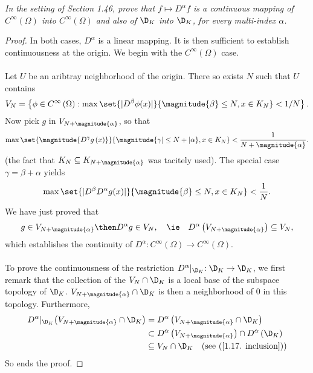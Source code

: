 \textit{In the setting of Section 1.46, prove that 
    $f \mapsto D^{\alpha}f$ 
is a continuous mapping of 
%
  $C^{\infty}\left(\Omega\right)$ into 
  $C^{\infty}\left(\Omega\right)$ and also of 
  $\D_{K}$ into 
  $\D_{K}$, for every multi-index $\alpha$.
%
}
\begin{proof} 
In both cases, $D^\alpha$ is a linear mapping. 
It is then sufficient to establish continuousness at the origin.
%
We begin with the $C^\infty\left(\Omega\right)$ case. \\
\\
Let $U$ be an aribtray neighborhood of the origin.
There so exists $N$ such that $U$ contains
%
  \begin{align} 
    V_{N}= \left\{
      \phi \in C^\infty\left(\Omega\right): 
      \max\set{
        | D^\beta\phi (x) |
      }{
        \magnitude{ \beta } \leq N, x\in K_N
      }
    < 1/N
    \right\}.
  \end{align}
%
Now pick $g$ in $V_{N+\magnitude{\alpha}}$, so that
%
  \begin{align}
    \max
    \set{
      \magnitude{ D^\gamma g\left(x\right) }
    }{
      \magnitude{ \gamma | \leq N+| \alpha }, 
      x\in K_{N}
    }
    < \frac{1}{N+\magnitude{\alpha}}.
  \end{align}
%
(the fact that $K_N\subseteq K_{N+\magnitude{\alpha}}$ was tacitely used).
%
The special case $\gamma = \beta + \alpha$ yields
\begin{align}
    \max
    \set{
      | D^\beta D^\alpha g(x)|
    }{
      \magnitude{\beta} \leq N, 
      x\in K_{N}
    }
    < \frac{1}{N}.
  \end{align}
%
We have just proved that
%
  \begin{align}\label{1.17. inclusion}
    g \in V_{N + \magnitude{\alpha}}
      \then 
    D^\alpha g \in V_{N},
      \quad
      \ie
      \quad
    D^\alpha \left(V_{N+\magnitude{\alpha}}\right) \subseteq V_N,
  \end{align}
%
which establishes the continuity of %
%
  $D^{\alpha}: C^\infty \left(\Omega\right)\to C^\infty \left(\Omega\right)$. %
%
\\\\
To prove the continuousness of the restriction 
%
  $D^\alpha \lvert_{\D_K}: \D_K \to \D_K$, %
%
%
we first remark that the collection of the  
%
  ${V_N \cap \D_K}$ %
%
is a local base of the subspace topology of $\D_K$.
%
%
  $V_{N+\magnitude{\alpha}} \cap \D_K$ %
%
is then a neighborhood of $0$ in this topology. %
Furthermore, 
%
  \begin{align}
    D^\alpha \lvert_{\D_K} \left(V_{N+\magnitude{\alpha}} \cap \D_K\right) 
    & = 
      D^\alpha\left(V_{N+\magnitude{\alpha}} \cap \D_K\right) \\
    & \subset
      D^\alpha\left(V_{N+\magnitude{\alpha}}\right) 
        \cap 
      D^\alpha\left(\D_K\right) \\
    & \subseteq 
      V_N 
        \cap 
      \D_K
          \quad (\text{see }(\ref{1.17. inclusion}))
  \end{align}
%
So ends the proof.
\end{proof}
